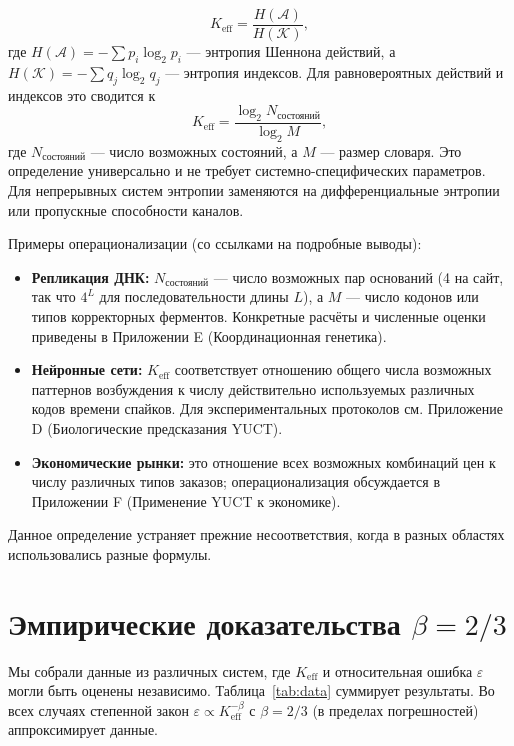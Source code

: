 \documentclass[12pt]{article}
\newcommand{\Keff}{K_{\mathrm{eff}}}
\newcommand{\eps}{\varepsilon}
\begin{document}
	\begin{equation}
		\Keff = \frac{H(\mathcal{A})}{H(\mathcal{K})},
		\label{eq:keff}
	\end{equation}
	где \(H(\mathcal{A}) = -\sum p_i \log_2 p_i\) — энтропия Шеннона действий, а \(H(\mathcal{K}) = -\sum q_j \log_2 q_j\) — энтропия индексов. Для равновероятных действий и индексов это сводится к
	\begin{equation}
		\Keff = \frac{\log_2 N_{\text{состояний}}}{\log_2 M},
		\label{eq:keff-simple}
	\end{equation}
	где \(N_{\text{состояний}}\) — число возможных состояний, а \(M\) — размер словаря. Это определение универсально и не требует системно-специфических параметров. Для непрерывных систем энтропии заменяются на дифференциальные энтропии или пропускные способности каналов.
	
	Примеры операционализации (со ссылками на подробные выводы):
	\begin{itemize}
		\item \textbf{Репликация ДНК:} \(N_{\text{состояний}}\) — число возможных пар оснований (4 на сайт, так что \(4^L\) для последовательности длины \(L\)), а \(M\) — число кодонов или типов корректорных ферментов. Конкретные расчёты и численные оценки приведены в Приложении E (Координационная генетика).
		\item \textbf{Нейронные сети:} \(\Keff\) соответствует отношению общего числа возможных паттернов возбуждения к числу действительно используемых различных кодов времени спайков. Для экспериментальных протоколов см. Приложение D (Биологические предсказания YUCT).
		\item \textbf{Экономические рынки:} это отношение всех возможных комбинаций цен к числу различных типов заказов; операционализация обсуждается в Приложении F (Применение YUCT к экономике).
	\end{itemize}
	Данное определение устраняет прежние несоответствия, когда в разных областях использовались разные формулы.
	
	\section{Эмпирические доказательства \(\beta = 2/3\)}
	\label{sec:evidence}
	
	Мы собрали данные из различных систем, где \(\Keff\) и относительная ошибка \(\eps\) могли быть оценены независимо. Таблица~\ref{tab:data} суммирует результаты. Во всех случаях степенной закон \(\eps \propto \Keff^{-\beta}\) с \(\beta = 2/3\) (в пределах погрешностей) аппроксимирует данные.
	
\end{document}
